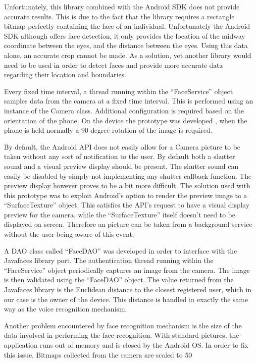Unfortunately, this library combined with the Android SDK does not provide accurate results. This is due to the fact that the library requires a rectangle bitmap perfectly containing the face of an individual. Unfortunately the Android SDK although offers face detection, it only provides the location of the midway coordinate between the eyes, and the distance between the eyes. Using this data alone, an accurate crop cannot be made. As a solution, yet another library would need to be used in order to detect faces and provide more accurate data regarding their location and boundaries.

Every fixed time interval, a thread running within the ``FaceService'' object samples data from the camera at a fixed time interval. This is performed using an instance of the Camera class. Additional configuration is required based on the orientation of the phone. On the device the prototype was developed \cite{}, when the phone is held normally a 90 degree rotation of the image is required.

By default, the Android API does not easily allow for a Camera picture to be taken without any sort of notification to the user. By default both a shutter sound and a visual preview display should be present. The shutter sound can easily be disabled by simply not implementing any shutter callback function. The preview display however proves to be a bit more difficult. The solution used with this prototype was to exploit Android's option to render the preview image to a ``SurfaceTexture'' object. This satisfies the API's request to have a visual display preview for the camera, while the ``SurfaceTexture'' itself doesn't need to be displayed on screen. Therefore an picture can be taken from a background service without the user being aware of this event.

A DAO class called ``FaceDAO'' was developed in order to interface with the Javafaces library port. The authentication thread running within the ``FaceService'' object periodically captures an image from the camera. The image is then validated using the ``FaceDAO'' object. The value returned from the Javafaces library is the Euclidean distance to the closest registered user, which in our case is the owner of the device. This distance is handled in exactly the same way as the voice recognition mechanism.

Another problem encountered by face recognition mechanism is the size of the data involved in performing the face recognition. With standard pictures, the application runs out of memory and is closed by the Android OS. In order to fix this issue, Bitmaps collected from the camera are scaled to 50%

